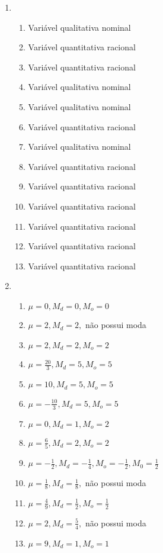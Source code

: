 \documentclass[a4paper]{article}
\begin{document}
\begin{enumerate}
\item 
  \begin{enumerate}
  \item Variável qualitativa nominal
  \item Variável quantitativa racional
  \item Variável quantitativa racional
  \item Variável qualitativa nominal
  \item Variável qualitativa nominal
  \item Variável quantitativa racional
  \item Variável qualitativa nominal
  \item Variável quantitativa racional
  \item Variável quantitativa racional
  \item Variável quantitativa racional
  \item Variável quantitativa racional
  \item Variável quantitativa racional
  \item Variável quantitativa racional
  \end{enumerate}

\item %
  \begin{enumerate}
  \item $\mu=0,M_d=0,M_o=0$
  \item $\mu=2 ,M_d=2,$ não possui moda
  \item $\mu=2 ,M_d=2 ,M_o=2$
  \item $\mu=\frac{20}{3},M_d=5 ,M_o=5$
  \item $\mu=10 ,M_d=5 ,M_o=5$
  \item $\mu=-\frac{10}{3} ,M_d=5 ,M_o=5$
  \item $\mu=0 ,M_d=1 ,M_o=2$
  \item $\mu=\frac{6}{5} ,M_d=2 ,M_o=2$
  \item $\mu=-\frac{1}{2} ,M_d=-\frac{1}{4} ,M_o=-\frac{1}{2}, M_0=\frac{1}{2}$
  \item $\mu=\frac{1}{8} ,M_d=\frac{1}{8},$ não possui moda
  \item $\mu=\frac{4}{9} ,M_d=\frac{1}{2} ,M_o=\frac{1}{2}$
  \item $\mu=2 ,M_d=\frac{5}{4} ,$ não possui moda
  \item $\mu=9 ,M_d=1 ,M_o=1$
  \end{enumerate}


\end{enumerate}
\end{document}
